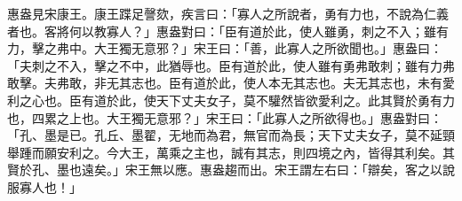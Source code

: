 \begin{pinyinscope}
惠盎見宋康王。康王蹀足謦欬，疾言曰：「寡人之所說者，勇有力也，不說為仁義者也。客將何以教寡人？」惠盎對曰：「臣有道於此，使人雖勇，刺之不入；雖有力，擊之弗中。大王獨无意邪？」宋王曰：「善，此寡人之所欲聞也。」惠盎曰：「夫刺之不入，擊之不中，此猶辱也。臣有道於此，使人雖有勇弗敢刺；雖有力弗敢擊。夫弗敢，非无其志也。臣有道於此，使人本无其志也。夫无其志也，未有愛利之心也。臣有道於此，使天下丈夫女子，莫不驩然皆欲愛利之。此其賢於勇有力也，四累之上也。大王獨无意邪？」宋王曰：「此寡人之所欲得也。」惠盎對曰：「孔、墨是已。孔丘、墨翟，无地而為君，無官而為長；天下丈夫女子，莫不延頸舉踵而願安利之。今大王，萬乘之主也，誠有其志，則四境之內，皆得其利矣。其賢於孔、墨也遠矣。」宋王無以應。惠盎趨而出。宋王謂左右曰：「辯矣，客之以說服寡人也！」


\end{pinyinscope}